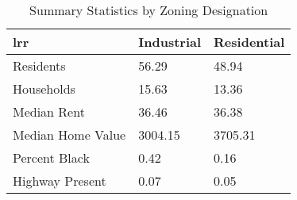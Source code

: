 \begin{table}[h]
\centering
\caption{Summary Statistics by Zoning Designation}
\label{tab:summary_stats_zone}
\begin{tabularx}{\textwidth}{X|X}{lrr}
\toprule
 & Industrial & Residential \\
\midrule
Residents & 56.29 & 48.94 \\
Households & 15.63 & 13.36 \\
Median Rent & 36.46 & 36.38 \\
Median Home Value & 3004.15 & 3705.31 \\
Percent Black & 0.42 & 0.16 \\
Highway Present & 0.07 & 0.05 \\
\bottomrule
\end{tabularx}
\end{table}
